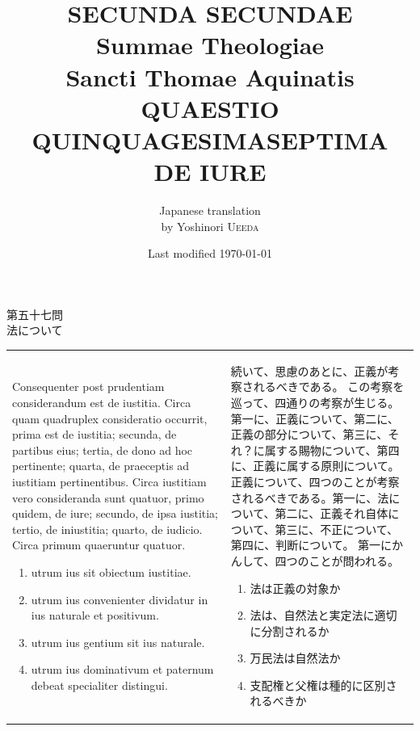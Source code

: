 \documentclass[paper=a4paper,fontsize=10pt,jafontsize=9pt,titlepage]{jlreq}
\title{{\bfseries SECUNDA SECUNDAE}\\{\Huge Summae Theologiae}\\Sancti Thomae
Aquinatis\\{\sffamily QUAESTIO QUINQUAGESIMASEPTIMA}\\DE IURE}
\author{Japanese translation\\by Yoshinori {\scshape Ueeda}}
\date{Last modified \today}
\begin{document}
\maketitle

\begin{center}
{\Large 第五十七問\\法について}
\end{center}

\begin{longtable}{p{21em}p{21em}}

{\huge C}onsequenter post prudentiam considerandum est de iustitia. Circa quam
quadruplex consideratio occurrit, prima est de iustitia; secunda, de
partibus eius; tertia, de dono ad hoc pertinente; quarta, de praeceptis
ad iustitiam pertinentibus. Circa iustitiam vero consideranda sunt
quatuor, primo quidem, de iure; secundo, de ipsa iustitia; tertio, de
iniustitia; quarto, de iudicio. Circa primum quaeruntur quatuor. 

\begin{enumerate}
 \item  utrum ius sit obiectum iustitiae.
 \item utrum ius convenienter dividatur in ius naturale et positivum.
 \item utrum ius gentium sit ius naturale.
 \item utrum ius dominativum et paternum debeat specialiter distingui.

\end{enumerate}


&

続いて、思慮のあとに、正義が考察されるべきである。
この考察を巡って、四通りの考察が生じる。第一に、正義について、第二に、正義の部分について、第三に、それ？に属する賜物について、第四に、正義に属する原則について。
正義について、四つのことが考察されるべきである。第一に、法について、第二に、正義それ自体について、第三に、不正について、第四に、判断について。
第一にかんして、四つのことが問われる。
\begin{enumerate}
 \item 法は正義の対象か
 \item 法は、自然法と実定法に適切に分割されるか
 \item 万民法は自然法か
 \item 支配権と父権は種的に区別されるべきか
\end{enumerate}


\end{longtable}
\newpage

\end{document}
